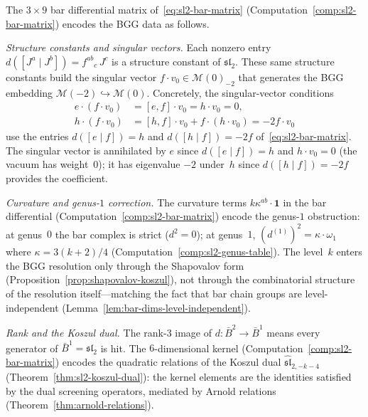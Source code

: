 \begin{computation}
\label{comp:bgg-from-bar-matrix}

The $3 \times 9$ bar differential matrix
of~\eqref{eq:sl2-bar-matrix}
(Computation~\ref{comp:sl2-bar-matrix}) encodes the
BGG data as follows.

\emph{Structure constants and singular vectors.}
Each nonzero entry
$d([J^a \mid J^b]) = {f^{ab}}_c\, J^c$ is a structure
constant of $\mathfrak{sl}_2$.  These same structure
constants build the singular vector
$f \cdot v_0 \in \mathcal{M}(0)_{-2}$ that generates
the BGG embedding
$\mathcal{M}(-2) \hookrightarrow \mathcal{M}(0)$.
Concretely, the singular-vector conditions
\begin{align}
e \cdot (f \cdot v_0)
  &= [e, f] \cdot v_0 = h \cdot v_0 = 0,
  \label{eq:sv-check-e} \\
h \cdot (f \cdot v_0)
  &= [h, f] \cdot v_0 + f \cdot (h \cdot v_0)
  = -2f \cdot v_0
  \label{eq:sv-check-h}
\end{align}
use the entries $d([e \mid f]) = h$ and
$d([h \mid f]) = -2f$ of~\eqref{eq:sl2-bar-matrix}.
The singular vector is annihilated by $e$ since
$d([e \mid f]) = h$ and $h \cdot v_0 = 0$
(the vacuum has weight~$0$); it has eigenvalue $-2$
under~$h$ since $d([h \mid f]) = -2f$ provides the
coefficient.

\emph{Curvature and genus-$1$ correction.}\quad
The curvature terms $k\kappa^{ab} \cdot \mathbf{1}$
in the bar differential
(Computation~\ref{comp:sl2-bar-matrix}) encode the
genus-$1$ obstruction: at genus~$0$ the bar complex
is strict ($d^2 = 0$); at genus~$1$,
$(d^{(1)})^2 = \kappa \cdot \omega_1$ where
$\kappa = 3(k{+}2)/4$
(Computation~\ref{comp:sl2-genus-table}).
The level~$k$ enters the BGG resolution only
through the Shapovalov form
(Proposition~\ref{prop:shapovalov-koszul}), not
through the combinatorial structure of the
resolution itself---matching the fact that bar
chain groups are level-independent
(Lemma~\ref{lem:bar-dims-level-independent}).

\emph{Rank and the Koszul dual.}
The rank-$3$ image of $d\colon \bar{B}^2 \to \bar{B}^1$
means every generator of
$\bar{B}^1 = \mathfrak{sl}_2$ is hit.
The $6$-dimensional kernel
(Computation~\ref{comp:sl2-bar-matrix}) encodes the
quadratic relations of the Koszul dual
$\widehat{\mathfrak{sl}}_{2,-k-4}$
(Theorem~\ref{thm:sl2-koszul-dual}):
the kernel elements are the identities satisfied by
the dual screening operators, mediated by
Arnold relations (Theorem~\ref{thm:arnold-relations}).
\end{computation}


